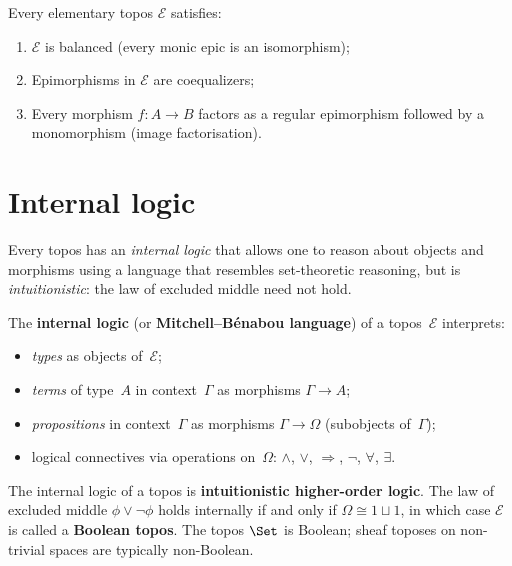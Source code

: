 \begin{proposition}\label{prop:topos-properties}
Every elementary topos $\mathcal{E}$ satisfies:
\begin{enumerate}[label=(\alph*)]
\item $\mathcal{E}$ is balanced (every monic epic is an isomorphism);
\item Epimorphisms in $\mathcal{E}$ are coequalizers;
\item Every morphism $f\colon A\to B$ factors as a regular epimorphism
      followed by a monomorphism (image factorisation).
\end{enumerate}
\end{proposition}



\section{Internal logic}\label{sec:internal-logic}


Every topos has an \emph{internal logic} that allows one to reason about
objects and morphisms using a language that resembles set-theoretic
reasoning, but is \emph{intuitionistic}: the law of excluded middle need
not hold.

\begin{definition}\label{def:internal-logic}
The \textbf{internal logic} (or \textbf{Mitchell--B\'enabou language})
of a topos~$\mathcal{E}$ interprets:
\begin{itemize}
\item \emph{types} as objects of~$\mathcal{E}$;
\item \emph{terms} of type~$A$ in context~$\Gamma$ as morphisms
      $\Gamma\to A$;
\item \emph{propositions} in context~$\Gamma$ as morphisms $\Gamma\to\Omega$
      (subobjects of~$\Gamma$);
\item logical connectives via operations on~$\Omega$:
      $\wedge$, $\vee$, $\Rightarrow$, $\neg$, $\forall$, $\exists$.
\end{itemize}
\end{definition}

\begin{remark}\label{rem:internal-logic-intuitionistic}
The internal logic of a topos is \textbf{intuitionistic higher-order logic}.
The law of excluded middle $\phi\vee\neg\phi$ holds internally if and only
if $\Omega\cong 1\sqcup 1$, in which case $\mathcal{E}$ is called a
\textbf{Boolean topos}.  The topos $\Set$ is Boolean; sheaf toposes on
non-trivial spaces are typically non-Boolean.
\end{remark}

